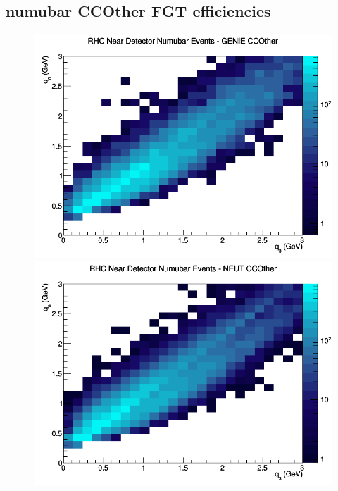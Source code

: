 \subsection{numubar CCOther FGT efficiencies}
\begin{figure}[h]
\includegraphics[width=\linewidth]{eff_q0_q3/FGT/CCOther_RHC_ND_numubar_q3_q0_GENIE.png}
\endminipage
{}
\includegraphics[width=\linewidth]{eff_q0_q3/FGT/CCOther_RHC_ND_numubar_q3_q0_NEUT.png}
\endminipage
{}

\end{figure}

